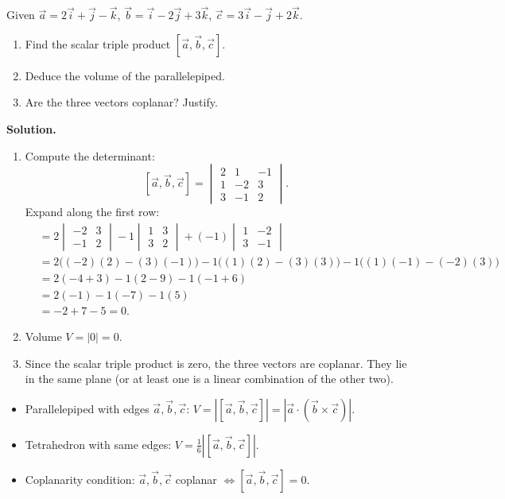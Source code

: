 \documentclass[11pt]{article}
\begin{document}
\begin{exoresolu}
Given $\vec{a}=2\vec{i}+\vec{j}-\vec{k}$, $\vec{b}=\vec{i}-2\vec{j}+3\vec{k}$, $\vec{c}=3\vec{i}-\vec{j}+2\vec{k}$.
\begin{enumerate}
\item Find the scalar triple product $[\vec{a},\vec{b},\vec{c}]$.
\item Deduce the volume of the parallelepiped.
\item Are the three vectors coplanar? Justify.
\end{enumerate}
\tcblower
\textbf{Solution.}
\begin{enumerate}
\item Compute the determinant:
\[
[\vec{a},\vec{b},\vec{c}]=
\begin{vmatrix}
2 & 1 & -1 \\
1 & -2 & 3 \\
3 & -1 & 2
\end{vmatrix}.
\]
Expand along the first row:
\begin{align*}
&=2\begin{vmatrix}-2&3\\-1&2\end{vmatrix}
-1\begin{vmatrix}1&3\\3&2\end{vmatrix}
+(-1)\begin{vmatrix}1&-2\\3&-1\end{vmatrix}\\
&=2\bigl((-2)(2)-(3)(-1)\bigr)
-1\bigl((1)(2)-(3)(3)\bigr)
-1\bigl((1)(-1)-(-2)(3)\bigr)\\
&=2(-4+3)-1(2-9)-1(-1+6)\\
&=2(-1)-1(-7)-1(5)\\
&=-2+7-5=0.
\end{align*}
\item Volume $V=|0|=0$.
\item Since the scalar triple product is zero, the three vectors are coplanar. They lie in the same plane (or at least one is a linear combination of the other two).
\end{enumerate}
\end{exoresolu}

\begin{aretenir}
\begin{itemize}
\item Parallelepiped with edges $\vec{a},\vec{b},\vec{c}$: $V = |[\vec{a},\vec{b},\vec{c}]| = |\vec{a}\cdot(\vec{b}\times\vec{c})|$.
\item Tetrahedron with same edges: $V = \frac{1}{6}|[\vec{a},\vec{b},\vec{c}]|$.
\item Coplanarity condition: $\vec{a},\vec{b},\vec{c}$ coplanar $\iff [\vec{a},\vec{b},\vec{c}] = 0$.
\end{itemize}
\end{aretenir}
\end{document}
